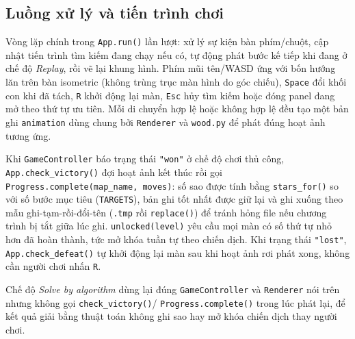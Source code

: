 \subsection{Luồng xử lý và tiến trình chơi}

Vòng lặp chính trong \texttt{App.run()} lần lượt: xử lý sự kiện bàn
phím/chuột, cập nhật tiến trình tìm kiếm đang chạy nếu có, tự động phát bước kế tiếp khi đang ở chế độ
\textit{Replay}, rồi vẽ lại khung hình. Phím mũi tên/WASD ứng với bốn
hướng lăn trên bàn isometric (không trùng trục màn hình do góc chiếu),
\texttt{Space} đổi khối con khi đã tách, \texttt{R} khởi động lại màn,
\texttt{Esc} hủy tìm kiếm hoặc đóng panel đang mở theo thứ tự ưu tiên. Mỗi
di chuyển hợp lệ hoặc không hợp lệ đều tạo một bản ghi \texttt{animation}
dùng chung bởi \texttt{Renderer} và \texttt{wood.py} để phát đúng hoạt ảnh
tương ứng.

Khi \texttt{GameController} báo trạng thái \texttt{"won"} ở chế độ chơi
thủ công,  \texttt{App.check\_victory()} đợi hoạt ảnh kết thúc rồi gọi
\texttt{Progress.complete(map\_name, moves)}: số sao được tính bằng
\texttt{stars\_for()} so với số bước mục tiêu (\texttt{TARGETS}), bản ghi
tốt nhất được giữ lại và ghi xuống  theo mẫu
ghi-tạm-rồi-đổi-tên (\texttt{.tmp} rồi \texttt{replace()}) để tránh hỏng
file nếu chương trình bị tắt giữa lúc ghi. \texttt{unlocked(level)} yêu
cầu mọi màn có số thứ tự nhỏ hơn đã hoàn thành, tức mở khóa tuần tự theo
chiến dịch. Khi trạng thái \texttt{"lost"}, \texttt{App.check\_defeat()}
tự khởi động lại màn sau khi hoạt ảnh rơi phát xong, không cần người chơi
nhấn \texttt{R}.

Chế độ \textit{Solve by algorithm} dùng lại đúng \texttt{GameController}
và \texttt{Renderer} nói trên nhưng không gọi \texttt{check\_victory()}/
\texttt{Progress.complete()} trong lúc phát lại, để kết quả giải bằng
thuật toán không ghi sao hay mở khóa chiến dịch thay người chơi.
